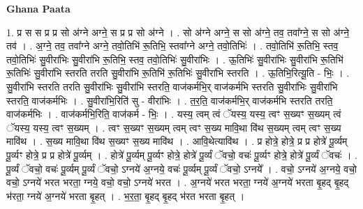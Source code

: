 \documentclass[17pt]{extarticle}
\begin{document}
\textbf{Ghana Paata } \newline

1. प्र स स प्र प्र सो अ॑ग्ने अग्ने॒ स प्र प्र सो अ॑ग्ने । . सो अ॑ग्ने अग्ने॒ स सो अ॑ग्ने॒ तव॒ तवा᳚ग्ने॒ स सो अ॑ग्ने॒ तव॑ । . अ॒ग्ने॒ तव॒ तवा᳚ग्ने अग्ने॒ तवो॒तिभि॑ रू॒तिभि॒ स्तवा᳚ग्ने अग्ने॒ तवो॒तिभिः॑ । . तवो॒तिभि॑ रू॒तिभि॒ स्तव॒ तवो॒तिभिः॑ सु॒वीरा॑भिः सु॒वीरा॑भि रू॒तिभि॒ स्तव॒ तवो॒तिभिः॑ सु॒वीरा॑भिः । . ऊ॒तिभिः॑ सु॒वीरा॑भिः सु॒वीरा॑भि रू॒तिभि॑ रू॒तिभिः॑ सु॒वीरा॑भि स्तरति तरति सु॒वीरा॑भि रू॒तिभि॑ रू॒तिभिः॑ सु॒वीरा॑भि स्तरति । . ऊ॒तिभि॒रित्यू॒ति - भिः॒ । . सु॒वीरा॑भि स्तरति तरति सु॒वीरा॑भिः सु॒वीरा॑भि स्तरति॒ वाज॑कर्मभि॒र् वाज॑कर्मभि स्तरति सु॒वीरा॑भिः सु॒वीरा॑भि स्तरति॒ वाज॑कर्मभिः । . सु॒वीरा॑भि॒रिति॑ सु - वीरा॑भिः । . त॒र॒ति॒ वाज॑कर्मभि॒र् वाज॑कर्मभि स्तरति तरति॒ वाज॑कर्मभिः । . वाज॑कर्मभि॒रिति॒ वाज॑कर्म - भिः॒ । . यस्य॒ त्वम् त्वं ॅयस्य॒ यस्य॒ त्वꣳ स॒ख्यꣳ स॒ख्यम् त्वं ॅयस्य॒ यस्य॒ त्वꣳ स॒ख्यम् । . त्वꣳ स॒ख्यꣳ स॒ख्यम् त्वम् त्वꣳ स॒ख्य मावि॒था वि॑थ स॒ख्यम् त्वम् त्वꣳ स॒ख्य मावि॑थ । . स॒ख्य मावि॒था वि॑थ स॒ख्यꣳ स॒ख्य मावि॑थ । . आवि॒थेत्यावि॑थ । . प्र होत्रे॒ होत्रे॒ प्र प्र होत्रे॑ पू॒र्व्यम् पू॒र्व्यꣳ होत्रे॒ प्र प्र होत्रे॑ पू॒र्व्यम् । . होत्रे॑ पू॒र्व्यम् पू॒र्व्यꣳ होत्रे॒ होत्रे॑ पू॒र्व्यं ॅवचो॒ वचः॑ पू॒र्व्यꣳ होत्रे॒ होत्रे॑ पू॒र्व्यं ॅवचः॑ । . पू॒र्व्यं ॅवचो॒ वचः॑ पू॒र्व्यम् पू॒र्व्यं ॅवचो॒ ऽग्नये॑ अ॒ग्नये॒ वचः॑ पू॒र्व्यम् पू॒र्व्यं ॅवचो॒ ऽग्नये᳚ । . वचो॒ ऽग्नये॑ अ॒ग्नये॒ वचो॒ वचो॒ ऽग्नये॑ भरत भरता॒ ग्नये॒ वचो॒ वचो॒ ऽग्नये॑ भरत । . अ॒ग्नये॑ भरत भरता॒ ग्नये॑ अ॒ग्नये॑ भरता बृ॒हद् बृ॒हद् भ॑रता॒ ग्नये॑ अ॒ग्नये॑ भरता बृ॒हत् । . भ॒र॒ता॒ बृ॒हद् बृ॒हद् भ॑रत भरता बृ॒हत् । \newline
\end{document}
